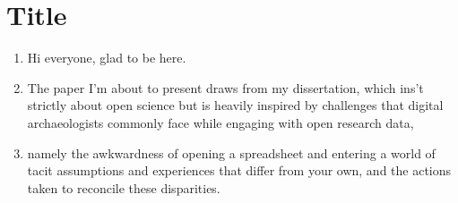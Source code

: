 \documentclass[12pt]{article}
\begin{document}
\pagestyle{fancy}

\section{Title}
\begin{enumerate}
  \item Hi everyone, glad to be here.
  \item The paper I'm about to present draws from my dissertation, which ins't strictly about open science but is heavily inspired by challenges that digital archaeologists commonly face while engaging with open research data,
  \item namely the awkwardness of opening a spreadsheet and entering a world of tacit assumptions and experiences that differ from your own, and the actions taken to reconcile these disparities.
\end{enumerate}
\end{document}
